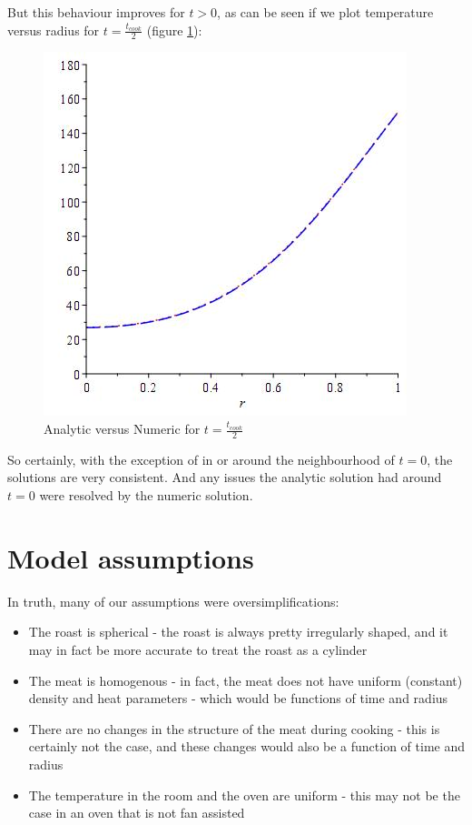 \documentclass{report}
\begin{document}
But this behaviour improves for $t > 0$, as can be seen if we plot temperature versus radius for 
$t = \frac{t_{cook}}{2}$ (figure \ref{fig:c4}):\bigskip

\begin{figure}[h]
\centering
\includegraphics[scale = 0.25]{compare-04}
\caption{Analytic versus Numeric for $t = \frac{t_{cook}}{2}$}
\label{fig:c4}
\end{figure}

So certainly, with the exception of in or around the neighbourhood of $t = 0$, the solutions are very consistent. And 
any issues the analytic solution had around $t = 0$ were resolved by the numeric solution.




\section{Model assumptions}

In truth, many of our assumptions were oversimplifications:\bigskip

\begin{itemize}

\item The roast is spherical - the roast is always pretty irregularly shaped, and it may in fact 
      be more accurate to treat the roast as a cylinder

\item The meat is homogenous - in fact, the meat does not have uniform (constant) density and heat 
      parameters - which would be functions of time and radius

\item There are no changes in the structure of the meat during cooking - this is certainly not the 
      case, and these changes would also be a function of time and radius

\item The temperature in the room and the oven are uniform - this may not be the case in an oven 
      that is not fan assisted

\end{itemize}
\end{document}
